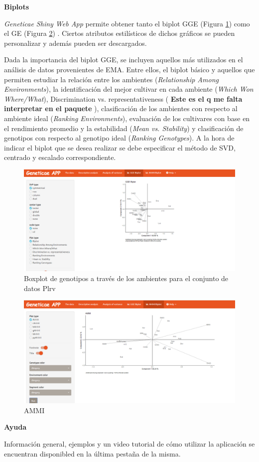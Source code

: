 \textbf{Biplots}

\emph{Geneticae Shiny Web App} permite obtener tanto el biplot GGE (Figura \ref{fig:fig4312}) como el GE (Figura \ref{fig:fig4313}) . Ciertos atributos estilísticos de dichos gráficos se pueden personalizar y además pueden ser descargados.

Dada la importancia del biplot GGE, se incluyen aquellos más utilizados en el análisis de datos provenientes de EMA. Entre ellos, el biplot básico y aquellos que permiten estudiar la relación entre los ambientes (\emph{Relationship Among Environments}), la identificación del mejor cultivar en cada ambiente (\emph{Which Won Where/What}), Discrimination vs. representativeness ( \textbf{Este es el q me falta interpretar en el paquete} ), clasificación de los ambientes con respecto al ambiente ideal (\emph{Ranking Environments}), evaluación de los cultivares con base en el rendimiento promedio y la estabilidad (\emph{Mean vs. Stability}) y  clasificación de genotipos con respecto al genotipo ideal (\emph{Ranking Genotypes}). A la hora de indicar el biplot que se desea realizar se debe especificar el método de SVD, centrado y escalado correspondiente.

\begin{figure}[H]
	\begin{center}
		\includegraphics[width=16cm]{./Graficos/GGE.png}
	\end{center}
	\caption{Boxplot de genotipos a través de los ambientes para el conjunto de datos Plrv}
	\label{fig:fig4312}
\end{figure}


\begin{figure}[H]
	\begin{center}
		\includegraphics[width=16cm]{./Graficos/AMMI_S.png}
	\end{center}
	\caption{AMMI}
	\label{fig:fig4313}
\end{figure}



\textbf{Ayuda}

Información general, ejemplos y un video tutorial de cómo utilizar la aplicación se encuentran disponibled en la última pestaña de la misma.
